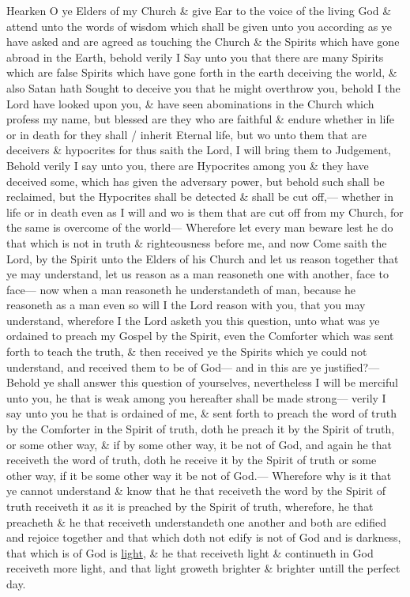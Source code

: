 				Hearken O ye Elders of my Church \& give Ear to the voice of the living God \& attend unto the words of wisdom which shall be given unto you according as ye have asked and are agreed as touching the Church \& the Spirits which have gone abroad in the Earth, behold verily I Say unto you that there are many Spirits which are false Spirits which have gone forth in the earth deceiving the world, \& also Satan hath Sought to deceive you that he might overthrow you, behold I the Lord have looked upon you, \& have seen abominations in the Church which profess my name, but blessed are they who are faithful \& endure whether in life or in death for they shall / inherit Eternal life, but wo unto them that are deceivers \& hypocrites for thus saith the Lord, I will bring them to Judgement, Behold verily I say unto you, there are Hypocrites among you \& they have deceived some, which has given the adversary power, but behold such shall be reclaimed, but the Hypocrites shall be detected \& shall be cut off,--- whether in life or in death even as I will and wo is them that are cut off from my Church, for the same is overcome of the world--- Wherefore let every man beware lest he do that which is not in truth \& righteousness before me, and now Come saith the Lord, by the Spirit unto the Elders of his Church and let us reason together that ye may understand, let us reason as a man reasoneth one with another, face to face--- now when a man reasoneth he understandeth of man, because he reasoneth as a man even so will I the Lord reason with you, that you may understand, wherefore I the Lord asketh you this question, unto what was ye ordained to preach my Gospel by the Spirit, even the Comforter which was sent forth to teach the truth, \& then received ye the Spirits which ye could not understand, and received them to be of God--- and in this are ye justified?--- Behold ye shall answer this question of yourselves, nevertheless I will be merciful unto you, he that is weak among you hereafter shall be made strong--- verily I say unto you he that is ordained of me, \& sent forth to preach the word of truth by the Comforter in the Spirit of truth, doth he preach it by the Spirit of truth, or some other way, \& if by some other way, it be not of God, and again he that receiveth the word of truth, doth he receive it by the Spirit of truth or some other way, if it be some other way it be not of God.--- Wherefore why is it that ye cannot understand \& know that he that receiveth the word by the Spirit of truth receiveth it as it is preached by the Spirit of truth, wherefore, he that preacheth \& he that receiveth understandeth one another and both are edified and rejoice together and that which doth not edify is not of God and is darkness, that which is of God is \uline{light}, \& he that receiveth light \& continueth in God receiveth more light, and that light groweth brighter \& brighter untill the perfect day.

